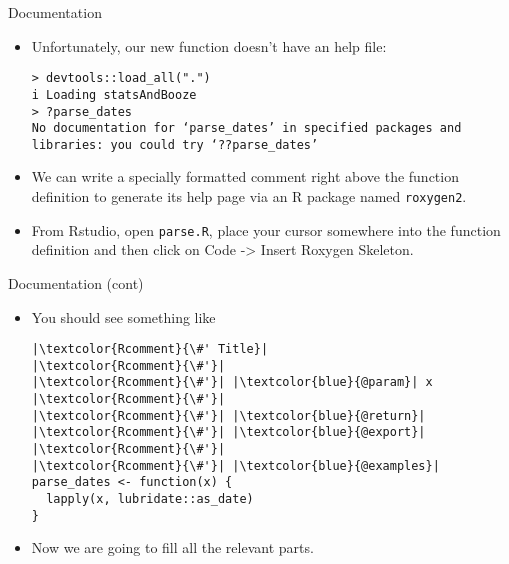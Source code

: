 \documentclass[
hyperref={bookmarks=false},
xcolor={dvipsnames,svgnames*,x11names*}, 
12pt
]{beamer}
\begin{document}
\begin{frame}[fragile]{Documentation}
\vspace{-0.5cm}
\begin{itemize}
\itemsep 2ex 
\item Unfortunately, our new function doesn't have an help file:
\begin{lstlisting}
> devtools::load_all(".")
i Loading statsAndBooze
> ?parse_dates
No documentation for ‘parse_dates’ in specified packages and libraries: you could try ‘??parse_dates’
\end{lstlisting}
\item We can write a specially formatted comment right above the function definition to generate its help page via an R package named \texttt{roxygen2}. 
\item From Rstudio, open \texttt{parse.R}, place your cursor somewhere into the function definition and then click on Code -> Insert Roxygen Skeleton. 
\end{itemize}
\end{frame}

\begin{frame}[fragile]{Documentation (cont)}
\vspace{-0.5cm}
\begin{itemize}
\itemsep 2ex
\item You should see something like
\begin{lstlisting}
|\textcolor{Rcomment}{\#' Title}|
|\textcolor{Rcomment}{\#'}|
|\textcolor{Rcomment}{\#'}| |\textcolor{blue}{@param}| x 
|\textcolor{Rcomment}{\#'}|
|\textcolor{Rcomment}{\#'}| |\textcolor{blue}{@return}|
|\textcolor{Rcomment}{\#'}| |\textcolor{blue}{@export}|
|\textcolor{Rcomment}{\#'}|
|\textcolor{Rcomment}{\#'}| |\textcolor{blue}{@examples}|
parse_dates <- function(x) {
  lapply(x, lubridate::as_date)
}
\end{lstlisting}
\item Now we are going to fill all the relevant parts. 
\end{itemize}
\end{frame}
\end{document}
